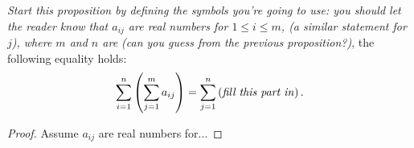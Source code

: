 \documentclass{article}
\begin{document}
\begin{prop*}[\S1.2, \#18] 
    \textit{Start this proposition by defining the symbols you're going to use: you should let the reader know that $a_{ij}$ are real numbers for $1 \leq i \leq m$, (a similar statement for $j$), where $m$ and $n$ are (can you guess from the previous proposition?)}, the following equality holds:
    \[ 
        \sum_{i = 1}^n \left( \sum_{j = 1}^m a_{ij} \right) 
        = \sum_{j = 1}^n \left( \text{\textit{fill this part in}} \right).
    \]
\end{prop*}


\begin{proof} 
    Assume $a_{ij}$ are real numbers for...
\end{proof}
\end{document}
